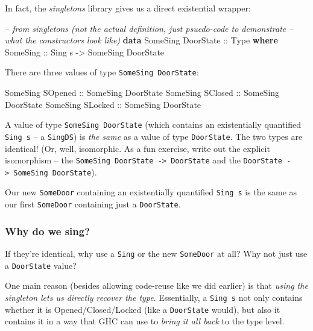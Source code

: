 \documentclass[]{article}
\newenvironment{Shaded}{}{}
\newcommand{\CommentTok}[1]{\textcolor[rgb]{0.38,0.63,0.69}{\textit{#1}}}
\newcommand{\DataTypeTok}[1]{\textcolor[rgb]{0.56,0.13,0.00}{#1}}
\newcommand{\KeywordTok}[1]{\textcolor[rgb]{0.00,0.44,0.13}{\textbf{#1}}}
\newcommand{\NormalTok}[1]{#1}
\newcommand{\OtherTok}[1]{\textcolor[rgb]{0.00,0.44,0.13}{#1}}
\begin{document}
In fact, the \emph{singletons} library gives us a direct existential wrapper:

\begin{Shaded}
\begin{Highlighting}[]
\CommentTok{-- from singletons (not the actual definition, just psuedo-code to demonstrate}
\CommentTok{-- what the constructors look like)}
\KeywordTok{data} \DataTypeTok{SomeSing} \DataTypeTok{DoorState}\OtherTok{ ::} \DataTypeTok{Type} \KeywordTok{where}
    \DataTypeTok{SomeSing}\OtherTok{ ::} \DataTypeTok{Sing}\NormalTok{ s }\OtherTok{->} \DataTypeTok{SomeSing} \DataTypeTok{DoorState}
\end{Highlighting}
\end{Shaded}

There are three values of type \texttt{SomeSing\ DoorState}:

\begin{Shaded}
\begin{Highlighting}[]
\DataTypeTok{SomeSing} \DataTypeTok{SOpened}\OtherTok{ ::} \DataTypeTok{SomeSing} \DataTypeTok{DoorState}
\DataTypeTok{SomeSing} \DataTypeTok{SClosed}\OtherTok{ ::} \DataTypeTok{SomeSing} \DataTypeTok{DoorState}
\DataTypeTok{SomeSing} \DataTypeTok{SLocked}\OtherTok{ ::} \DataTypeTok{SomeSing} \DataTypeTok{DoorState}
\end{Highlighting}
\end{Shaded}

A value of type \texttt{SomeSing\ DoorState} (which contains an existentially
quantified \texttt{Sing\ s} -- a \texttt{SingDS}) is \emph{the same} as a value
of type \texttt{DoorState}. The two types are identical! (Or, well, isomorphic.
As a fun exercise, write out the explicit isomorphism -- the
\texttt{SomeSing\ DoorState\ -\textgreater{}\ DoorState} and the
\texttt{DoorState\ -\textgreater{}\ SomeSing\ DoorState}).

Our new \texttt{SomeDoor} containing an existentially quantified
\texttt{Sing\ s} is the same as our first \texttt{SomeDoor} containing just a
\texttt{DoorState}.

\hypertarget{why-do-we-sing}{%
\subsubsection{Why do we sing?}\label{why-do-we-sing}}

If they're identical, why use a \texttt{Sing} or the new \texttt{SomeDoor} at
all? Why not just use a \texttt{DoorState} value?

One main reason (besides allowing code-reuse like we did earlier) is that
\emph{using the singleton lets us directly recover the type}. Essentially, a
\texttt{Sing\ s} not only contains whether it is Opened/Closed/Locked (like a
\texttt{DoorState} would), but also it contains it in a way that GHC can use to
\emph{bring it all back} to the type level.
\end{document}
